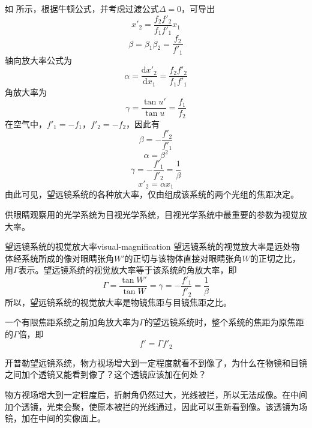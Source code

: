 \documentclass[cn,10pt,chinesefont=founder,math=newtx,cite=super,twoside]{elegantbook}
\begin{document}
如 所示，根据牛顿公式，并考虑过渡公式$\Delta=0$，可导出
\begin{equation}
x'_2=\frac{f_2f'_2}{f_1f'_1}x_1
\end{equation}
\begin{equation}
\beta=\beta_1\beta_2=\frac{f_2}{f'_1}
\end{equation}
轴向放大率公式为
\begin{equation}
\alpha=\frac{\mathrm{d}x'_2}{\mathrm{d}x_1}=\frac{f_2f'_2}{f_1f'_1}
\end{equation}
角放大率为
\begin{equation}
\gamma=\frac{\tan u'}{\tan u}=\frac{f_1}{f_2}
\end{equation}
在空气中，$f'_1=-f_1$，$f'_2=-f_2$，因此有
\begin{equation}
\beta=-\frac{f'_2}{f'_1}
\end{equation}
\begin{equation}
\alpha=\beta^2
\end{equation}
\begin{equation}
\gamma=-\frac{f'_1}{f'_2}=\frac{1}{\beta}
\end{equation}
\begin{equation}
x'_2=\alpha x_1
\end{equation}
由此可见，望远镜系统的各种放大率，仅由组成该系统的两个光组的焦距决定。

供眼睛观察用的光学系统为目视光学系统，目视光学系统中最重要的参数为视觉放大率。
\begin{definition}{望远镜系统的视觉放大率}{visual-magnification}
	望远镜系统的视觉放大率是远处物体经系统所成的像对眼睛张角$W'$的正切与该物体直接对眼睛张角$W$的正切之比，用$\varGamma$表示。望远镜系统的视觉放大率等于该系统的角放大率，即
	\begin{equation}
	\varGamma=\frac{\tan W'}{\tan W}=\gamma=-\frac{f'_1}{f'_2}=\frac{1}{\beta}
	\end{equation}
	所以，望远镜系统的视觉放大率是物镜焦距与目镜焦距之比。
\end{definition}

一个有限焦距系统之前加角放大率为$\varGamma$的望远镜系统时，整个系统的焦距为原焦距的$\varGamma$倍，即
\begin{equation}
f'=\varGamma f'_2
\end{equation}

\begin{problem}
	开普勒望远镜系统，物方视场增大到一定程度就看不到像了，为什么在物镜和目镜之间加个透镜又能看到像了？这个透镜应该加在何处？
\end{problem}
\begin{solution}
	物方视场增大到一定程度后，折射角仍然过大，光线被拦，所以无法成像。在中间加个透镜，光束会聚，使原本被拦的光线通过，因此可以重新看到像。该透镜为场镜，加在中间的实像面上。
\end{solution}
\end{document}
